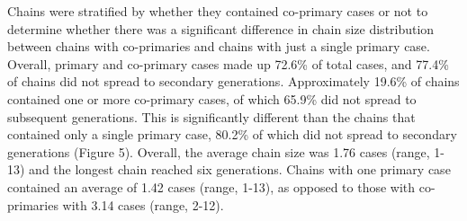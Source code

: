 Chains were stratified by whether they contained co-primary cases or not to determine whether there was a significant difference in chain size distribution between chains with co-primaries and chains with just a single primary case. Overall, primary and co-primary cases made up 72.6\% of total cases, and 77.4\% of chains did not spread to secondary generations. Approximately 19.6\% of chains contained one or more co-primary cases, of which 65.9\% did not spread to subsequent generations. This is significantly different than the chains that contained only a single primary case, 80.2\% of which did not spread to secondary generations (Figure 5). Overall, the average chain size was 1.76 cases (range, 1-13) and the longest chain reached six generations. Chains with one primary case contained an average of 1.42 cases (range, 1-13), as opposed to those with co-primaries with 3.14 cases (range, 2-12). 